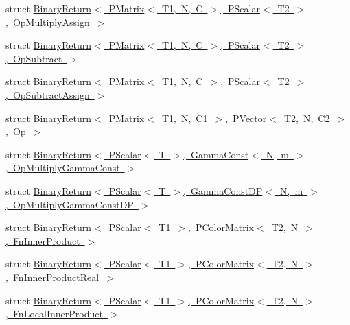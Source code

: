 \begin{DoxyCompactItemize}
\item 
struct \mbox{\hyperlink{structENSEM_1_1BinaryReturn_3_01PMatrix_3_01T1_00_01N_00_01C_01_4_00_01PScalar_3_01T2_01_4_00_01OpMultiplyAssign_01_4}{Binary\+Return$<$ P\+Matrix$<$ T1, N, C $>$, P\+Scalar$<$ T2 $>$, Op\+Multiply\+Assign $>$}}
\item 
struct \mbox{\hyperlink{structENSEM_1_1BinaryReturn_3_01PMatrix_3_01T1_00_01N_00_01C_01_4_00_01PScalar_3_01T2_01_4_00_01OpSubtract_01_4}{Binary\+Return$<$ P\+Matrix$<$ T1, N, C $>$, P\+Scalar$<$ T2 $>$, Op\+Subtract $>$}}
\item 
struct \mbox{\hyperlink{structENSEM_1_1BinaryReturn_3_01PMatrix_3_01T1_00_01N_00_01C_01_4_00_01PScalar_3_01T2_01_4_00_01OpSubtractAssign_01_4}{Binary\+Return$<$ P\+Matrix$<$ T1, N, C $>$, P\+Scalar$<$ T2 $>$, Op\+Subtract\+Assign $>$}}
\item 
struct \mbox{\hyperlink{structENSEM_1_1BinaryReturn_3_01PMatrix_3_01T1_00_01N_00_01C1_01_4_00_01PVector_3_01T2_00_01N_00_01C2_01_4_00_01Op_01_4}{Binary\+Return$<$ P\+Matrix$<$ T1, N, C1 $>$, P\+Vector$<$ T2, N, C2 $>$, Op $>$}}
\item 
struct \mbox{\hyperlink{structENSEM_1_1BinaryReturn_3_01PScalar_3_01T_01_4_00_01GammaConst_3_01N_00_01m_01_4_00_01OpMultiplyGammaConst_01_4}{Binary\+Return$<$ P\+Scalar$<$ T $>$, Gamma\+Const$<$ N, m $>$, Op\+Multiply\+Gamma\+Const $>$}}
\item 
struct \mbox{\hyperlink{structENSEM_1_1BinaryReturn_3_01PScalar_3_01T_01_4_00_01GammaConstDP_3_01N_00_01m_01_4_00_01OpMultiplyGammaConstDP_01_4}{Binary\+Return$<$ P\+Scalar$<$ T $>$, Gamma\+Const\+D\+P$<$ N, m $>$, Op\+Multiply\+Gamma\+Const\+D\+P $>$}}
\item 
struct \mbox{\hyperlink{structENSEM_1_1BinaryReturn_3_01PScalar_3_01T1_01_4_00_01PColorMatrix_3_01T2_00_01N_01_4_00_01FnInnerProduct_01_4}{Binary\+Return$<$ P\+Scalar$<$ T1 $>$, P\+Color\+Matrix$<$ T2, N $>$, Fn\+Inner\+Product $>$}}
\item 
struct \mbox{\hyperlink{structENSEM_1_1BinaryReturn_3_01PScalar_3_01T1_01_4_00_01PColorMatrix_3_01T2_00_01N_01_4_00_01FnInnerProductReal_01_4}{Binary\+Return$<$ P\+Scalar$<$ T1 $>$, P\+Color\+Matrix$<$ T2, N $>$, Fn\+Inner\+Product\+Real $>$}}
\item 
struct \mbox{\hyperlink{structENSEM_1_1BinaryReturn_3_01PScalar_3_01T1_01_4_00_01PColorMatrix_3_01T2_00_01N_01_4_00_01FnLocalInnerProduct_01_4}{Binary\+Return$<$ P\+Scalar$<$ T1 $>$, P\+Color\+Matrix$<$ T2, N $>$, Fn\+Local\+Inner\+Product $>$}}
\item 

\end{DoxyCompactItemize}
